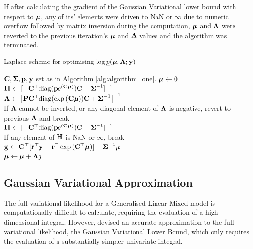 If after calculating the gradient of the Gaussian Variational lower bound with
respect to ${\boldsymbol \mu}$, any of its' elements were driven to NaN or $\infty$ due to
numeric overflow followed by matrix inversion during the computation, ${\boldsymbol \mu}$
and ${\boldsymbol \Lambda}$ were reverted to the previous iteration's ${\boldsymbol \mu}$ and ${\boldsymbol \Lambda}$
values and the algorithm was terminated.
		
\begin{algorithm}
	\caption{Laplace scheme for optimising $\log \underline{p}({\boldsymbol \mu}, {\boldsymbol \Lambda}; {\bf y})$}
	\label{alg:laplace_alg}
	\begin{algorithmic}
		\REQUIRE ${\bf C}, {\boldsymbol \Sigma}, {\bf p}, {\bf y}$ set as in Algorithm \ref{alg:algorithm_one}.
		\STATE ${\boldsymbol \mu} \leftarrow {\bf0}$ \\ [2ex]
		\STATE ${\bf H} \leftarrow [- {\bf C}^\top \text{diag}({\bf p} e^{({\bf C} {\boldsymbol \mu})}) {\bf C} - {\boldsymbol \Sigma}^{-1}]^{-1}$ \\ [2ex]
        \STATE ${\boldsymbol \Lambda} \leftarrow \left [{\bf P} {\bf C}^\top \text{diag}(\exp{({\bf C}{\boldsymbol\mu})}) {\bf C} + {\boldsymbol \Sigma}^{-1} \right ]^{-1}$ \\ [2ex]
		If ${\boldsymbol \Lambda}$ cannot be inverted, or any diagonal element of ${\boldsymbol \Lambda}$ is negative, revert to previous
		${\boldsymbol \Lambda}$ and break \\ [2ex]
		\STATE ${\bf H}
		\leftarrow [- {\bf C}^\top \text{diag}({\bf p} e^{({\bf C} {\boldsymbol \mu})}) {\bf C} - {\boldsymbol \Sigma}^{-1}]^{-1}$ \\[2ex]
		If any element of ${\bf H}$ is NaN or $\infty$, break \\ [2ex]
		\STATE ${\bf g} \leftarrow {\bf C}^\top[{\bf r}^\top{\bf y} - {\bf r}^\top\exp{({\bf C}^\top{\boldsymbol\mu})}] - {\boldsymbol \Sigma}^{-1}{\boldsymbol \mu}$ \\ [2ex]
		\STATE ${\boldsymbol \mu} \leftarrow {\boldsymbol\mu} + {\boldsymbol \Lambda} g$ \\[2ex]
		\ENDWHILE
	\end{algorithmic}
\end{algorithm}
		
\subsection{Gaussian Variational Approximation}
		
The full variational likelihood for a Generalised Linear Mixed model is
computationally difficult to calculate, requiring the evaluation of a high
dimensional integral. However, \cite{Ormerod2012} devised an accurate
approximation to the full variational likelihood, the Gaussian Variational
Lower Bound, which only requires the evaluation of a substantially simpler
univariate integral.
	
